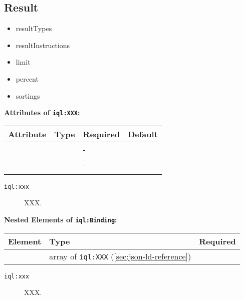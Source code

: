 \documentclass[11pt]{article}
\newcommand{\iqlns}{iql:}
\newcommand{\iqlType}[1]{\texttt{\iqlns#1}}
\newcommand{\attributes}[1]{\noindent\textbf{Attributes of \iqlType{#1}:}\newline\medskip}
\newcommand{\elements}[1]{\noindent\textbf{Nested Elements of \iqlType{#1}:}\newline\medskip}
\begin{document}
\subsection{Result}
\label{sec:json-ld-result}
\begin{itemize}
\item resultTypes
\item resultInstructions
\item limit
\item percent
\item sortings
\end{itemize}
\attributes{XXX}
\begin{tabular}{|p{}|p{}|p{}|p{}|}
	\hline
	\textbf{Attribute} & \textbf{Type} & \textbf{Required} & \textbf{Default} \\ 
	\hline
	\hline
	&  & - &  \\ 
	\hline 
	&  & - &  \\ 
	\hline 
	&  &  & \\ 
	\hline 
\end{tabular}
\begin{description}
	\item[\iqlType{xxx}] XXX.
\end{description}
\elements{Binding}
\begin{tabular}{|p{}|p{}|p{}|}
	\hline
	\textbf{Element} & \textbf{Type} & \textbf{Required} \\ 
	\hline
	\hline 
	& array of \iqlType{XXX} (\ref{sec:json-ld-reference}) &  \\ 
	\hline 
\end{tabular}
\begin{description}
	\item[\iqlType{xxx}] XXX.
\end{description}

\end{document}

